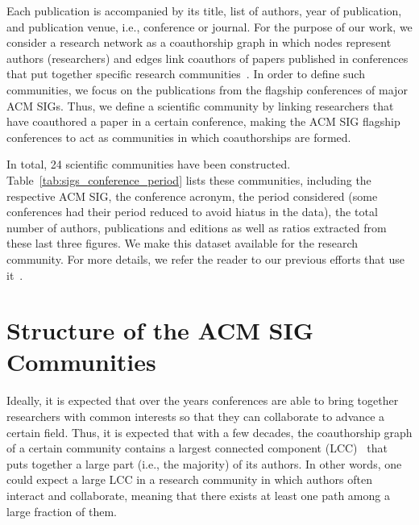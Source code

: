 \documentclass{sig-alternate-10pt}
\begin{document}
Each publication is accompanied by its title, list of authors, year of publication, and publication venue, i.e., conference or journal. For the purpose of our work, we consider a research network as a coauthorship graph in which nodes represent authors (researchers) and edges link coauthors of papers published in conferences that put together specific research communities~\cite{Alves:2013}. In order to define such communities, we focus on the publications from the flagship conferences of major ACM SIGs. Thus, we define a scientific community by linking researchers that have coauthored a paper in a certain conference, making the ACM SIG flagship conferences to act as communities in which coauthorships are formed.

In total, 24 scientific communities have been constructed. Table~\ref{tab:sigs_conference_period} lists these communities, including the respective ACM SIG, the conference acronym, the period considered (some conferences had their period reduced to avoid hiatus in the data), the total number of authors, publications and editions as well as ratios extracted from these last three figures. We make this dataset available for the research community.
For more details, we refer the reader to our previous efforts that use it~\cite{Alves:2013,benevenuto2015hindexparadox}.


\section{Structure of the ACM SIG \\ Communities}


Ideally, it is expected that over the years conferences are able to bring together researchers with common interests so that they can collaborate to advance a certain field. Thus, it is expected that with a few decades, the coauthorship graph of a certain community contains a largest connected component (LCC)~\cite{newman2010networks} that puts together a large part (i.e., the majority) of its authors. In other words, one could expect a large LCC in a research community in which authors often interact and collaborate, meaning that there exists at least one path among a large fraction of them.
\end{document}
